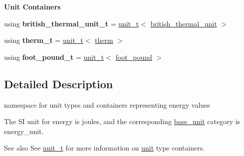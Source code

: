 \begin{Indent}{\bf Unit Containers}
\begin{DoxyCompactItemize}
\item 
\hypertarget{namespaceunits_1_1energy_a6cf08dcfb2bd1807aa6415febebc79c0}{}using {\bfseries british\+\_\+thermal\+\_\+unit\+\_\+t} = \hyperlink{classunits_1_1unit__t}{unit\+\_\+t}$<$ \hyperlink{structunits_1_1unit}{british\+\_\+thermal\+\_\+unit} $>$\label{namespaceunits_1_1energy_a6cf08dcfb2bd1807aa6415febebc79c0}

\item 
\hypertarget{namespaceunits_1_1energy_a4058bb5b85b992d455094344f6ebdd63}{}using {\bfseries therm\+\_\+t} = \hyperlink{classunits_1_1unit__t}{unit\+\_\+t}$<$ \hyperlink{structunits_1_1unit}{therm} $>$\label{namespaceunits_1_1energy_a4058bb5b85b992d455094344f6ebdd63}

\item 
\hypertarget{namespaceunits_1_1energy_acbfd7049c50acdc91556b4cc0ad39376}{}using {\bfseries foot\+\_\+pound\+\_\+t} = \hyperlink{classunits_1_1unit__t}{unit\+\_\+t}$<$ \hyperlink{structunits_1_1unit}{foot\+\_\+pound} $>$\label{namespaceunits_1_1energy_acbfd7049c50acdc91556b4cc0ad39376}

\end{DoxyCompactItemize}
\end{Indent}


\subsection{Detailed Description}
namespace for unit types and containers representing energy values 

The S\+I unit for energy is {\ttfamily joules}, and the corresponding {\ttfamily \hyperlink{structunits_1_1base__unit}{base\+\_\+unit}} category is {\ttfamily energy\+\_\+unit}. \begin{DoxySeeAlso}{See also}
See \hyperlink{classunits_1_1unit__t}{unit\+\_\+t} for more information on \hyperlink{structunits_1_1unit}{unit} type containers. 
\end{DoxySeeAlso}
